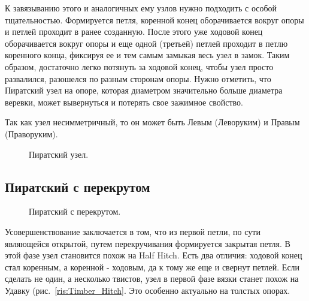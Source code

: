 К завязыванию этого и аналогичных ему узлов нужно подходить с особой тщательностью. Формируется петля, коренной конец оборачивается вокруг опоры и петлей проходит в ранее созданную. После этого уже ходовой конец оборачивается вокруг опоры и еще одной (третьей) петлей проходит в петлю коренного конца, фиксируя ее и тем самым замыкая весь узел в замок. Таким образом, достаточно легко потянуть за ходовой конец, чтобы узел просто развалился, разошелся по разным сторонам опоры. Нужно отметить, что Пиратский узел на опоре, которая диаметром значительно больше диаметра веревки, может вывернуться и потерять свое зажимное свойство.

Так как узел несимметричный, то он может быть Левым (Леворуким) и Правым (Праворуким).

\begin{figure}[H]\centering
	\subfloat[Левый]{\label{ris:Piratsky_1_3}
	\tcbox[enhanced jigsaw,colframe=black,opacityframe=0.5,opacityback=0.5]
		{\centering
			}
		}
\hfil
	\subfloat[Правый]{\label{ris:Piratsky_1_4}
	\tcbox[enhanced jigsaw,colframe=black,opacityframe=0.5,opacityback=0.5]
		{\centering
			}
		}
	\caption{Пиратский узел.}\label{ris:Piratsky}
\end{figure}

\subsection{Пиратский с перекрутом}

\begin{figure}[H]\centering
\hfil
	\caption{Пиратский с перекрутом.}\label{ris:Perekrut}
\end{figure}

Усовершенствование заключается в том, что из первой петли, по сути являющейся открытой, путем перекручивания формируется закрытая петля. В этой фазе узел становится похож на Half Hitch. Есть два отличия: ходовой конец стал коренным, а коренной - ходовым, да к тому же еще и свернут петлей. Если сделать не один, а несколько твистов, узел в первой фазе вязки станет похож на Удавку (рис.~\ref{ris:Timber_Hitch}. Это особенно актуально на толстых опорах.


